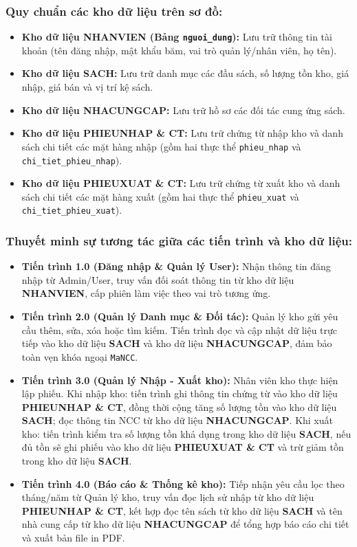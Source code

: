 \documentclass[12pt,a4paper]{article}
\begin{document}
\subsubsection*{Quy chuẩn các kho dữ liệu trên sơ đồ:}
\begin{itemize}
    \item \textbf{Kho dữ liệu NHANVIEN (Bảng \texttt{nguoi\_dung}):} Lưu trữ thông tin tài khoản (tên đăng nhập, mật khẩu băm, vai trò quản lý/nhân viên, họ tên).
    \item \textbf{Kho dữ liệu SACH:} Lưu trữ danh mục các đầu sách, số lượng tồn kho, giá nhập, giá bán và vị trí kệ sách.
    \item \textbf{Kho dữ liệu NHACUNGCAP:} Lưu trữ hồ sơ các đối tác cung ứng sách.
    \item \textbf{Kho dữ liệu PHIEUNHAP \& CT:} Lưu trữ chứng từ nhập kho và danh sách chi tiết các mặt hàng nhập (gồm hai thực thể \texttt{phieu\_nhap} và \texttt{chi\_tiet\_phieu\_nhap}).
    \item \textbf{Kho dữ liệu PHIEUXUAT \& CT:} Lưu trữ chứng từ xuất kho và danh sách chi tiết các mặt hàng xuất (gồm hai thực thể \texttt{phieu\_xuat} và \texttt{chi\_tiet\_phieu\_xuat}).
\end{itemize}

\subsubsection*{Thuyết minh sự tương tác giữa các tiến trình và kho dữ liệu:}
\begin{itemize}
    \item \textbf{Tiến trình 1.0 (Đăng nhập \& Quản lý User):} Nhận thông tin đăng nhập từ Admin/User, truy vấn đối soát thông tin từ kho dữ liệu \textbf{NHANVIEN}, cấp phiên làm việc theo vai trò tương ứng.
    \item \textbf{Tiến trình 2.0 (Quản lý Danh mục \& Đối tác):} Quản lý kho gửi yêu cầu thêm, sửa, xóa hoặc tìm kiếm. Tiến trình đọc và cập nhật dữ liệu trực tiếp vào kho dữ liệu \textbf{SACH} và kho dữ liệu \textbf{NHACUNGCAP}, đảm bảo toàn vẹn khóa ngoại \texttt{MaNCC}.
    \item \textbf{Tiến trình 3.0 (Quản lý Nhập - Xuất kho):} Nhân viên kho thực hiện lập phiếu. Khi nhập kho: tiến trình ghi thông tin chứng từ vào kho dữ liệu \textbf{PHIEUNHAP \& CT}, đồng thời cộng tăng số lượng tồn vào kho dữ liệu \textbf{SACH}; đọc thông tin NCC từ kho dữ liệu \textbf{NHACUNGCAP}. Khi xuất kho: tiến trình kiểm tra số lượng tồn khả dụng trong kho dữ liệu \textbf{SACH}, nếu đủ tồn sẽ ghi phiếu vào kho dữ liệu \textbf{PHIEUXUAT \& CT} và trừ giảm tồn trong kho dữ liệu \textbf{SACH}.
    \item \textbf{Tiến trình 4.0 (Báo cáo \& Thống kê kho):} Tiếp nhận yêu cầu lọc theo tháng/năm từ Quản lý kho, truy vấn đọc lịch sử nhập từ kho dữ liệu \textbf{PHIEUNHAP \& CT}, kết hợp đọc tên sách từ kho dữ liệu \textbf{SACH} và tên nhà cung cấp từ kho dữ liệu \textbf{NHACUNGCAP} để tổng hợp báo cáo chi tiết và xuất bản file in PDF.
\end{itemize}
\end{document}
